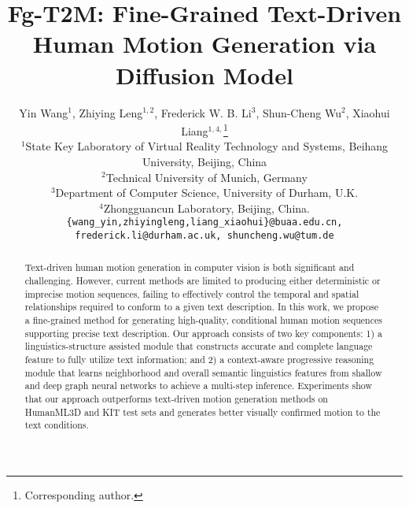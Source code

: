\documentclass[10pt,twocolumn,letterpaper]{article}
\begin{document}
\title{Fg-T2M: Fine-Grained Text-Driven Human Motion Generation via Diffusion Model}



\author{Yin Wang$^{1}$,
Zhiying Leng$^{1,2}$,
Frederick W. B. Li$^{3}$,
Shun-Cheng Wu$^{2}$, 
Xiaohui Liang$^{1,4,}$\thanks{Corresponding author.} \\ [2mm]
\small$^{1}$State Key Laboratory of Virtual Reality Technology and Systems, Beihang University, Beijing, China\\
\small$^{2}$Technical University of Munich, Germany\\
\small$^{3}$Department of Computer Science, University of Durham, U.K.\\
\small$^{4}$Zhongguancun Laboratory, Beijing, China.
\\
{\tt\small \{wang\_yin,zhiyingleng,liang\_xiaohui\}@buaa.edu.cn, frederick.li@durham.ac.uk, shuncheng.wu@tum.de}
}


\maketitle
\ificcvfinal\thispagestyle{empty}\fi


\begin{abstract}

   Text-driven human motion generation in computer vision is both significant and challenging. However, current methods are limited to producing either deterministic or imprecise motion sequences, failing to effectively control the temporal and spatial relationships required to conform to a given text description. In this work, we propose a fine-grained method for generating high-quality, conditional human motion sequences supporting precise text description. Our approach consists of two key components: 1) a linguistics-structure assisted module that constructs accurate and complete language feature to fully utilize text information; and 2) a context-aware progressive reasoning module that learns neighborhood and overall semantic linguistics features from shallow and deep graph neural networks to achieve a multi-step inference. Experiments show that our approach outperforms text-driven motion generation methods on HumanML3D and KIT test sets and generates better visually confirmed motion to the text conditions.


\end{abstract}
\end{document}
